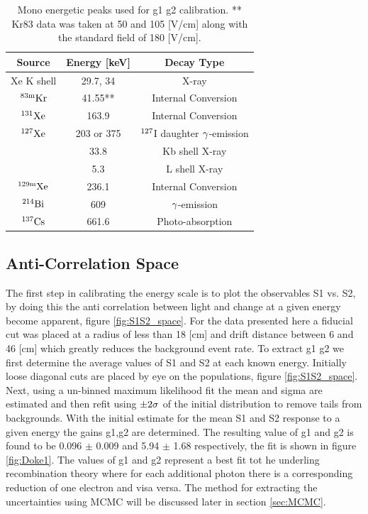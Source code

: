 \begin{table}[h!]
\centering
\footnotesize
\begin{tabular}{|c|c|c|}
\hline
Source & Energy [keV] &Decay Type  \\ [0.5ex] %
\hline
Xe K shell  & 29.7, 34 	 		& X-ray							\\ \hline
 $\rm ^{83m}Kr$ 	& 41.55**		& Internal Conversion			\\ \hline
 $\rm ^{131}Xe$ 	& 163.9		& Internal Conversion			\\ \hline
$\rm ^{127}Xe$ 	& 203 or 375	& $\rm^{127}$I daughter $\rm \gamma$-emission	\\ \hline
				      & 33.8			& Kb shell X-ray 						\\ \hline
				      & 5.3			& L shell X-ray 					\\ \hline
$\rm ^{129m}Xe$	& 236.1		& Internal Conversion 			\\ \hline
$\rm ^{214}Bi	$	& 609 			& $\rm \gamma$-emission				 \\ \hline
 $\rm ^{137}Cs$	& 661.6		& Photo-absorption 					\\ [0.5ex] 
\hline
\end{tabular}
\caption{Mono energetic peaks used for g1 g2 calibration. ** Kr83 data was taken at 50 and 105 [V/cm] along with the standard field of 180 [V/cm].}
\label{table:Cal_lines}
\end{table}



\subsection{Anti-Correlation Space}
The first step in calibrating the energy scale is to plot the observables S1 vs. S2, by doing this the anti correlation between light and change at a given energy become apparent, figure \ref{fig:S1S2_space}. For the data presented here a fiducial cut was placed at a radius of less than 18 [cm] and drift distance between 6 and 46 [cm] which greatly reduces the background event rate. To extract g1 g2 we first determine the average values of S1 and S2 at each known energy. Initially loose diagonal cuts are placed by eye on the populations, figure \ref{fig:S1S2_space}. Next, using a un-binned maximum likelihood fit the mean and sigma are estimated and then refit using $\rm \pm 2\sigma$ of the initial distribution to remove tails from backgrounds. With the initial estimate for the mean S1 and S2 response to a given energy the gains g1,g2 are determined. The resulting value of g1 and g2 is found to be 0.096 $\pm$ 0.009 and 5.94 $\pm$ 1.68 respectively, the fit is shown in figure \ref{fig:Doke1}. The values of g1 and g2 represent a best fit tot he underling recombination theory where for each additional photon there is a corresponding reduction of one electron and visa versa. The method for extracting the uncertainties using MCMC will be discussed later in section \ref{sec:MCMC}.

